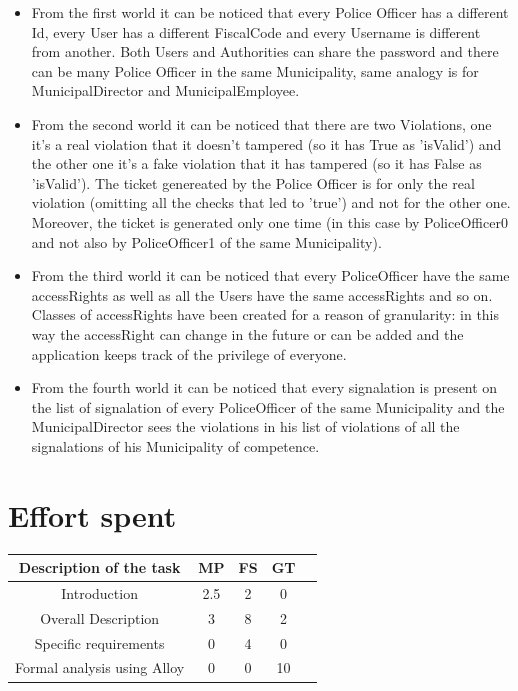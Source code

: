 \documentclass{article}
\begin{document}
\begin{itemize}
    \item From the first world it can be noticed that every Police Officer has
a different Id, every User has a different FiscalCode and every Username is
different from another. Both Users and Authorities can share the password and
there can be many Police Officer in the same Municipality, same analogy is for
MunicipalDirector and MunicipalEmployee.

    \item From the second world it can be noticed that there are two
Violations, one it's a real violation that it doesn't tampered (so it has True
as 'isValid') and the other one it's a fake violation that it has tampered (so
it has False as 'isValid'). The ticket genereated by the Police Officer is for
only the real violation (omitting all the checks that led to 'true') and not for
the other one. Moreover, the ticket is generated only one time (in this case by
PoliceOfficer0 and not also by PoliceOfficer1 of the same Municipality).

    \item From the third world it can be noticed that every PoliceOfficer have
the same accessRights as well as all the Users have the same accessRights and so
on. Classes of accessRights have been created for a reason of granularity: in
this way the accessRight can change in the future or can be added and the
application keeps track of the privilege of everyone.

    \item From the fourth world it can be noticed that every signalation is
present on the list of signalation of every PoliceOfficer of the same
Municipality and the MunicipalDirector sees the violations in his list of
violations of all the signalations of his Municipality of competence.
\end{itemize}

\newpage
\section{Effort spent}
\begin{center}
    \begin{tabular}{|c|c|c|c|c|}
        \hline
        \textbf{Description of the task} & \textbf{MP} & \textbf{FS} &
        \textbf{GT} \\
        \hline
        Introduction                    & 2.5   & 2     & 0     \\
        Overall Description             & 3     & 8     & 2     \\
        Specific requirements           & 0     & 4     & 0     \\
        Formal analysis using Alloy     & 0     & 0     & 10    \\
        \hline
    \end{tabular}
\end{center}

    
\end{document}
